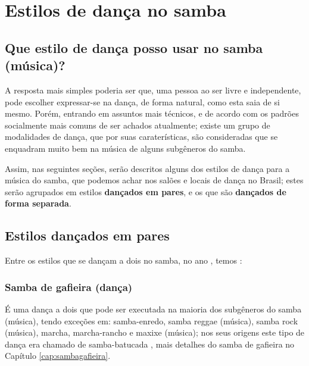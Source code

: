 
\chapter{Estilos de dança no samba}

\section{Que estilo de dança posso usar no samba (música)?}
\label{subsec:estilosdedanca}
A resposta mais simples poderia ser que, uma pessoa ao ser livre e independente,
pode escolher expressar-se na dança, de forma natural, como esta saia de si mesmo.
Porém, entrando em assuntos mais técnicos, 
e de acordo com os padrões socialmente mais comuns de ser achados atualmente;
existe um grupo de modalidades de dança, que por suas caraterísticas, 
são consideradas que se enquadram muito bem na música de alguns subgêneros do samba.

Assim, nas seguintes seções, serão descritos alguns dos estilos de dança para a música do samba,  
que podemos achar nos salões e locais de dança no Brasil;
estes serão agrupados em estilos \textbf{dançados em pares}, e os que são \textbf{dançados de forma separada}. 


\section{Estilos dançados em pares}
\label{subsec:estilosdedancapares}
Entre os estilos que se dançam a dois no samba, no ano \AnoLivro, temos \cite[pp. 134]{perna2002samba}:

\subsection{Samba de gafieira (dança)} 
É uma dança a dois que pode ser executada na maioria dos subgêneros do samba (música),
tendo exceções em: samba-enredo, samba reggae (música), samba rock (música), 
marcha, marcha-rancho e maxixe (música);
nos seus origens este tipo de dança era chamado de samba-batucada  \cite[pp. 134]{perna2002samba}, 
mais detalhes do samba de gafieira no Capítulo \ref{cap:sambagafieira}.

